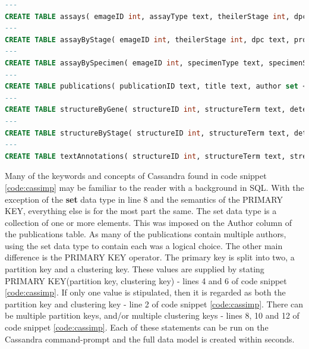 \begin{lstlisting}[language=SQL, caption=Example of how to create tables in Cassandra., label=code:cassimp]
---
CREATE TABLE assays( emageID int, assayType text, theilerStage int, dpc text, specimenType text, specimenStrain text, probeID text, source text, PRIMARY KEY (emageID));
---
CREATE TABLE assayByStage( emageID int, theilerStage int, dpc text, probeID text, source text, PRIMARY KEY (theilerStage, emageID));
---
CREATE TABLE assayBySpecimen( emageID int, specimenType text, specimenStrain text, probeID text, source text, PRIMARY KEY (specimenType, emageID));
---
CREATE TABLE publications( publicationID text, title text, author set <text>, emageID int, PRIMARY KEY(emageID));
---
CREATE TABLE structureByGene( structureID int, structureTerm text, detected boolean, geneName text, geneID text, emageID int, PRIMARY KEY ((geneName, detected, structureID), emageID));
---
CREATE TABLE structureByStage( structureID int, structureTerm text, detected boolean, theilerStage int, dpc text, PRIMARY KEY ((theilerStage, detected), structureID));
---
CREATE TABLE textAnnotations( structureID int, structureTerm text, strength text, detected boolean, geneName text, geneID text, dpc text, theilerStage int, emageID int, PRIMARY KEY (emageid,structureID,detected);
\end{lstlisting}

Many of the keywords and concepts of Cassandra found in code snippet \ref{code:cassimp} may be familiar to the reader with a background in SQL. With the exception of the \textbf{set} data type in line 8 and the semantics of the PRIMARY KEY, everything else is for the most part the same. The set data type is a collection of one or more elements. This was imposed on the Author column of the publications table. As many of the publications contain multiple authors, using the set data type to contain each was a logical choice. The other main difference is the PRIMARY KEY operator. The primary key is split into two, a partition key and a clustering key. These values are supplied by stating PRIMARY KEY(partition key, clustering key) - lines 4 and 6 of code snippet \ref{code:cassimp}. If only one value is stipulated, then it is regarded as both the partition key and clustering key - line 2 of code snippet \ref{code:cassimp}. There can be multiple partition keys, and/or multiple clustering keys - lines 8, 10 and 12 of code snippet \ref{code:cassimp}. Each of these statements can be run on the Cassandra command-prompt and the full data model is created within seconds.


